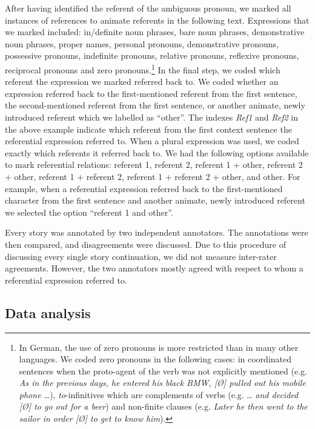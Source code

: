 \documentclass[output=paper,colorlinks,citecolor=brown]{langscibook}
\begin{document}
After having identified the referent of the ambiguous pronoun, we marked all instances of references to animate referents in the following text. Expressions that we marked included: in/definite noun phrases, bare noun phrases, demonstrative noun phrases, proper names, personal pronouns, demonstrative pronouns, possessive pronouns, indefinite pronouns, relative pronouns, reflexive pronouns, reciprocal pronouns and zero pronouns.\footnote{In German, the use of zero pronouns is more restricted than in many other languages. We coded zero pronouns in the following cases: in coordinated sentences when the proto-agent of the verb was not explicitly mentioned (e.g. \textit{As in the previous days, he entered his black BMW, [Ø] pulled out his mobile phone …}), \textit{to}-infinitives which are complements of verbs (e.g. … \textit{and decided [Ø] to go out for a beer}) and non-finite clauses (e.g. \textit{Later he then went to the sailor in order [Ø] to get to know him}).} In the final step, we coded which referent the expression we marked referred back to. We coded whether an expression referred back to the first-mentioned referent from the first sentence, the second-mentioned referent from the first sentence, or another animate, newly introduced referent which we labelled as “other”. The indexes \textit{Ref1} and \textit{Ref2} in the above example indicate which referent from the first context sentence the referential expression referred to. When a plural expression was used, we coded exactly which referents it referred back to. We had the following options available to mark referential relations: referent 1, referent 2, referent 1 + other, referent 2 + other, referent 1 + referent 2, referent 1 + referent 2 + other, and other. For example, when a referential expression referred back to the first-mentioned character from the first sentence and another animate, newly introduced referent we selected the option “referent 1 and other”. 

Every story was annotated by two independent annotators. The annotations were then compared, and disagreements were discussed. Due to this procedure of discussing every single story continuation, we did not measure inter-rater agreements. However, the two annotators mostly agreed with respect to whom a referential expression referred to.  

\subsection{Data analysis}\label{sec:fuchs:2.4}
\end{document}
